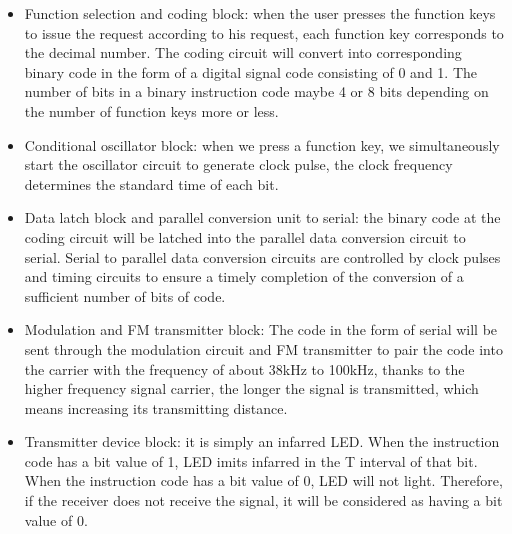 \documentclass[a4paper]{report}
\begin{document}
        \begin{itemize}
            \item Function selection and coding block: when the user presses the function keys to 
            issue the request according to his request, each function key corresponds to the decimal 
            number. The coding circuit will convert into corresponding binary code in the form of a 
            digital signal code consisting of 0 and 1. The number of bits in a binary instruction code 
            maybe 4 or 8 bits depending on the number of function keys more or less.
            \item Conditional oscillator block: when we press a function key, we simultaneously start the 
            oscillator circuit to generate clock pulse, the clock frequency determines the standard time of each bit.
            \item Data latch block and parallel conversion unit to serial: the binary code at the coding circuit 
            will be latched into the parallel data conversion circuit to serial. Serial to parallel data conversion 
            circuits are controlled by clock pulses and timing circuits to ensure a timely completion of the conversion 
            of a sufficient number of bits of code.
            \item Modulation and FM transmitter block: The code in the form of serial will be sent through 
            the modulation circuit and FM transmitter to pair the code into the carrier with the frequency 
            of about 38kHz to 100kHz, thanks to the higher frequency signal carrier, the longer the signal 
            is transmitted, which means increasing its transmitting distance.
            \item Transmitter device block: it is simply an infarred LED. When the instruction code has a bit 
            value of 1, LED imits infarred in the T interval of that bit. When the instruction code has a 
            bit value of 0, LED will not light. Therefore, if the receiver does not receive the signal, it will 
            be considered as having a bit value of 0.
        \end{itemize}
    \newpage
\end{document}
